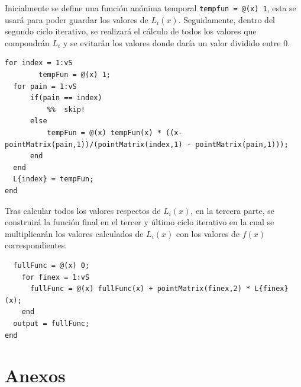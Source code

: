 \documentclass[english,notitlepage,letterpaper, 10pt]{article} %
\begin{document}
\begin{enumerate}
\begin{enumerate}
      Inicialmente se define una función anónima temporal \texttt{tempfun = @(x) 1}, esta se usará para poder guardar los valores de $L_i(x)$. Seguidamente, dentro del segundo ciclo iterativo, se realizará el cálculo de todos los valores que compondrán $L_i$ y se evitarán los valores donde daría un valor dividido entre 0.

      \begin{lstlisting}
for index = 1:vS
        tempFun = @(x) 1;
  for pain = 1:vS
      if(pain == index)
          %%  skip!
      else
          tempFun = @(x) tempFun(x) * ((x-pointMatrix(pain,1))/(pointMatrix(index,1) - pointMatrix(pain,1)));
      end
  end
  L{index} = tempFun;
end
      \end{lstlisting}
      
      Tras calcular todos los valores respectos de $L_i(x)$, en la tercera parte, se construirá la función final en el tercer y último ciclo iterativo en la cual se multiplicarán los valores calculados de $L_i(x)$ con los valores de $f(x)$ correspondientes.

      \begin{lstlisting}
  fullFunc = @(x) 0;
    for finex = 1:vS
      fullFunc = @(x) fullFunc(x) + pointMatrix(finex,2) * L{finex}(x);
    end
  output = fullFunc;
end
      \end{lstlisting}

    \end{enumerate}
\end{enumerate}

\newpage

\section{Anexos}
\end{document}
